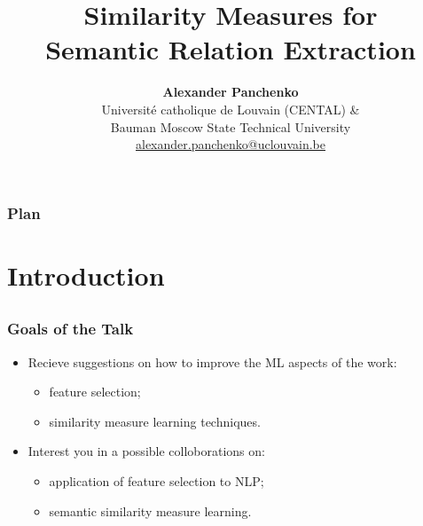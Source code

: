 \documentclass{beamer}
\title[\insertframenumber/\inserttotalframenumber]
{\textbf{Similarity Measures  for \\ Semantic Relation Extraction}}
\author[Alexander Panchenko]
{\textbf{Alexander Panchenko} \\ Université catholique de Louvain (CENTAL) \& \\ Bauman Moscow State Technical University   \\ { \url{alexander.panchenko@uclouvain.be}  }}
\begin{document}
\begin{frame}
  \titlepage
\end{frame}

\begin{frame}
  \setcounter{tocdepth}{1}
  \frametitle{Plan}
  \tableofcontents
  \setcounter{tocdepth}{2}
	
\end{frame}

\section{Introduction}
\subsection{}


\begin{frame}
\frametitle{Goals of the Talk}


\begin{itemize}
  \item Recieve suggestions on how to improve the ML aspects of the work:
  \begin{itemize}
    \item feature selection;
    \item similarity measure learning techniques.
   
  \end{itemize}
  \item Interest you in a possible colloborations on:
  \begin{itemize}
    \item application of feature selection to NLP;
    \item semantic similarity measure learning.
  \end{itemize}
\end{itemize}

\end{frame}




       
\end{document}
